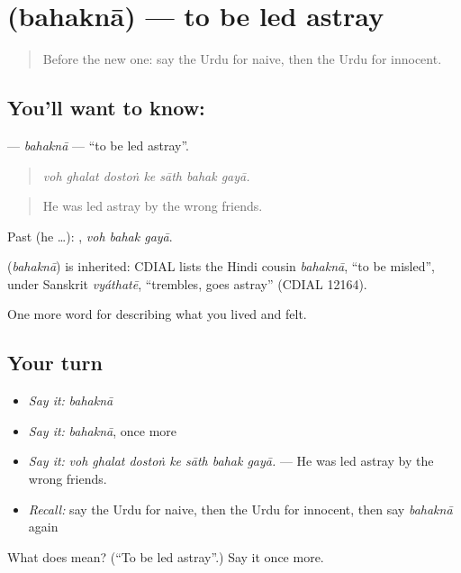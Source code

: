\section[\texorpdfstring{\ur{بہکنا} (bahaknā)}{بہکنا (bahaknā)}]{ (bahaknā) — to be led astray}

\label{lesson:UR-C462-bahakna}



\begin{quote}
Before the new one: say the Urdu for naive, then the Urdu for innocent.
\end{quote}

\subsection*{You'll want to know: }
\textbf{} — \emph{bahaknā} — \textquotedblleft{}to be led astray\textquotedblright{}.

\begin{quote}
      
\end{quote}

\begin{quote}
\emph{voh ghalat dostoṅ ke sāth bahak gayā.}
\end{quote}

\begin{quote}
He was led astray by the wrong friends.
\end{quote}

Past (he …):   , \emph{voh bahak gayā}.

\begin{cousinweb}
\textbf{} (\emph{bahaknā}) is inherited: CDIAL lists the Hindi cousin \emph{bahaknā}, \textquotedblleft{}to be misled\textquotedblright{}, under Sanskrit \emph{vyáthatē}, \textquotedblleft{}trembles, goes astray\textquotedblright{} (CDIAL 12164).
\end{cousinweb}

\begin{grammarlens}[title={What you've built}]
One more word for describing what you lived and felt.
\end{grammarlens}

\subsection*{Your turn}
\begin{itemize}
\raggedright
  \item \emph{Say it:} \emph{bahaknā}
  \item \emph{Say it:} \emph{bahaknā}, once more
  \item \emph{Say it:} \emph{voh ghalat dostoṅ ke sāth bahak gayā.} — He was led astray by the wrong friends.
  \item \emph{Recall:} say the Urdu for naive, then the Urdu for innocent, then say \emph{bahaknā} again
\end{itemize}

\begin{tcolorbox}[breakable,colback=teal!4,colframe=teal!35!black,title={Before you move on}]
What does  mean? (\textquotedblleft{}To be led astray\textquotedblright{}.) Say it once more.
\end{tcolorbox}
